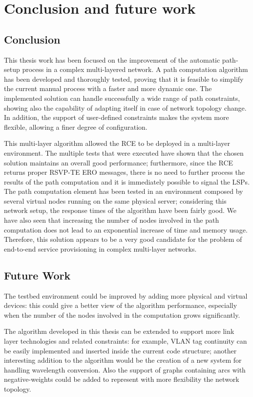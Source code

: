 \documentclass[10pt,a4paper]{report}
\begin{document}
\chapter{Conclusion and future work}\label{sec:conclusion}

\section{Conclusion}

This thesis work has been focused on the improvement of the automatic
path-setup process in a complex multi-layered network. A path
computation algorithm has been developed and thoroughly tested,
proving that it is feasible to simplify the current manual process
with a faster and more dynamic one. The implemented solution can
handle successfully a wide range of path constraints, showing also the
capability of adapting itself in case of network topology change. In
addition, the support of user-defined constraints makes the system
more flexible, allowing a finer degree of configuration.

This multi-layer algorithm allowed the RCE to be deployed in a
multi-layer environment. The multiple tests that were executed have
shown that the chosen solution maintains an overall good performance;
furthermore, since the RCE returns proper RSVP-TE ERO messages, there
is no need to further process the results of the path computation and
it is immediately possible to signal the LSPs. The path computation
element has been tested in an environment composed by several virtual
nodes running on the same physical server; considering this network
setup, the response times of the algorithm have been fairly good. We
have also seen that increasing the number of nodes involved in the
path computation does not lead to an exponential increase of time and
memory usage. Therefore, this solution appears to be a very good
candidate for the problem of end-to-end service provisioning in
complex multi-layer networks.

\section{Future Work}

The testbed environment could be improved by adding more physical and
virtual devices: this could give a better view of the algorithm
performance, especially when the number of the nodes involved in the
computation grows significantly.

The algorithm developed in this thesis can be extended to support more
link layer technologies and related constraints: for example, VLAN tag
continuity can be easily implemented and inserted inside the current
code structure; another interesting addition to the algorithm would be
the creation of a new system for handling wavelength conversion. Also
the support of graphs containing arcs with negative-weights could be
added to represent with more flexibility the network topology. 
\end{document}
